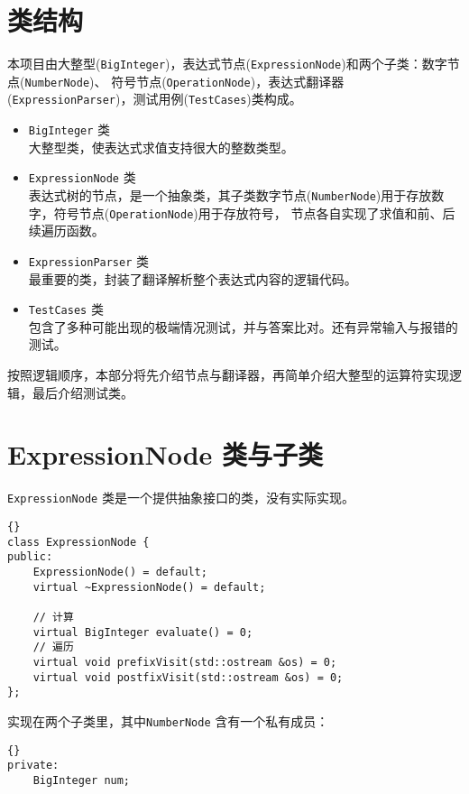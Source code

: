 
\chapter{类结构}
本项目由大整型(\lstinline{BigInteger})，表达式节点(\lstinline{ExpressionNode})和两个子类：数字节点(\lstinline{NumberNode})、%
符号节点(\lstinline{OperationNode})，表达式翻译器(\lstinline{ExpressionParser})，测试用例(\lstinline{TestCases})类构成。

\begin{itemize}
    \item \lstinline{BigInteger} 类\\
    大整型类，使表达式求值支持很大的整数类型。
    \item \lstinline{ExpressionNode} 类\\
    表达式树的节点，是一个抽象类，其子类数字节点(\lstinline{NumberNode})用于存放数字，符号节点(\lstinline{OperationNode})用于存放符号，%
    节点各自实现了求值和前、后续遍历函数。
    \item \lstinline{ExpressionParser} 类\\
    最重要的类，封装了翻译解析整个表达式内容的逻辑代码。
    \item \lstinline{TestCases} 类\\
    包含了多种可能出现的极端情况测试，并与答案比对。还有异常输入与报错的测试。
\end{itemize}

按照逻辑顺序，本部分将先介绍节点与翻译器，再简单介绍大整型的运算符实现逻辑，最后介绍测试类。

\chapter{ExpressionNode 类与子类}

\lstinline{ExpressionNode} 类是一个提供抽象接口的类，没有实际实现。
\begin{lstlisting}[morendkeywords={ExpressionNode}, firstnumber=383, caption=ExpressionNode 类定义]{}
class ExpressionNode {
public:
    ExpressionNode() = default;
    virtual ~ExpressionNode() = default;

    // 计算
    virtual BigInteger evaluate() = 0;
    // 遍历
    virtual void prefixVisit(std::ostream &os) = 0;
    virtual void postfixVisit(std::ostream &os) = 0;
};
\end{lstlisting}

实现在两个子类里，其中\lstinline{NumberNode} 含有一个私有成员：

\begin{lstlisting}[morendkeywords={ExpressionNode}, firstnumber=406]{}
private:
    BigInteger num;
\end{lstlisting}

